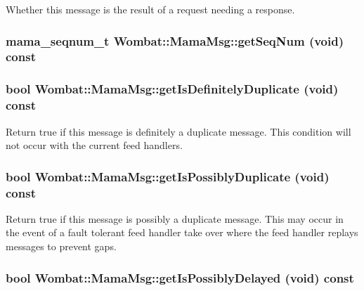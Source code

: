 Whether this message is the result of a request needing a response. \hypertarget{classWombat_1_1MamaMsg_a8942daee02db325054cffb096a9a6e96}{
\subsubsection[{getSeqNum}]{\setlength{\rightskip}{0pt plus 5cm}mama\_\-seqnum\_\-t Wombat::MamaMsg::getSeqNum (void) const}}
\label{classWombat_1_1MamaMsg_a8942daee02db325054cffb096a9a6e96}
\hypertarget{classWombat_1_1MamaMsg_aa29712e33dec9598f58d8b47d954a688}{
\subsubsection[{getIsDefinitelyDuplicate}]{\setlength{\rightskip}{0pt plus 5cm}bool Wombat::MamaMsg::getIsDefinitelyDuplicate (void) const}}
\label{classWombat_1_1MamaMsg_aa29712e33dec9598f58d8b47d954a688}


Return true if this message is definitely a duplicate message. This condition will not occur with the current feed handlers. \hypertarget{classWombat_1_1MamaMsg_a3ac6ff5481827b2be803a43f1e5675e6}{
\subsubsection[{getIsPossiblyDuplicate}]{\setlength{\rightskip}{0pt plus 5cm}bool Wombat::MamaMsg::getIsPossiblyDuplicate (void) const}}
\label{classWombat_1_1MamaMsg_a3ac6ff5481827b2be803a43f1e5675e6}


Return true if this message is possibly a duplicate message. This may occur in the event of a fault tolerant feed handler take over where the feed handler replays messages to prevent gaps. \hypertarget{classWombat_1_1MamaMsg_ad404a729cc7d7c213fd52e0235689d9e}{
\subsubsection[{getIsPossiblyDelayed}]{\setlength{\rightskip}{0pt plus 5cm}bool Wombat::MamaMsg::getIsPossiblyDelayed (void) const}}
\label{classWombat_1_1MamaMsg_ad404a729cc7d7c213fd52e0235689d9e}


